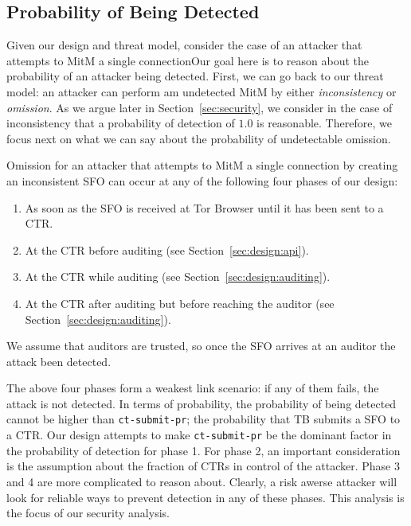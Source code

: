 \subsection{Probability of Being Detected}
Given our design and threat model, consider the case of an attacker that
attempts to MitM a single connectionOur goal here is to reason about the
probability of an attacker being detected. First, we can go back to our threat
model: an attacker can perform am undetected MitM by either \emph{inconsistency}
or \emph{omission}. As we argue later in Section~\ref{sec:security}, we consider
in the case of inconsistency that a probability of detection of $1.0$ is
reasonable. Therefore, we focus next on what we can say about the probability of
undetectable omission.

Omission for an attacker that attempts to MitM a single connection by creating
an inconsistent SFO can occur at any of the following four phases of our design:
\begin{enumerate}
    \item As soon as the SFO is received at Tor Browser until it has been sent
    to a CTR.
    \item At the CTR before auditing (see Section~\ref{sec:design:api}).
    \item At the CTR while auditing (see Section~\ref{sec:design:auditing}).
    \item At the CTR after auditing but before reaching the auditor (see
    Section~\ref{sec:design:auditing}).
\end{enumerate}

We assume that auditors are trusted, so once the SFO arrives at an auditor the
attack been detected. 

The above four phases form a weakest link scenario: if any of them fails, the
attack is not detected. In terms of probability, the probability of being
detected cannot be higher than \texttt{ct-submit-pr}; the probability that TB
submits a SFO to a CTR. Our design attempts to make \texttt{ct-submit-pr} be the
dominant factor in the probability of detection for phase 1. For phase 2, an
important consideration is the assumption about the fraction of CTRs in control
of the attacker. Phase 3 and 4 are more complicated to reason about. Clearly, a
risk awerse attacker will look for reliable ways to prevent detection in any of
these phases. This analysis is the focus of our security analysis.